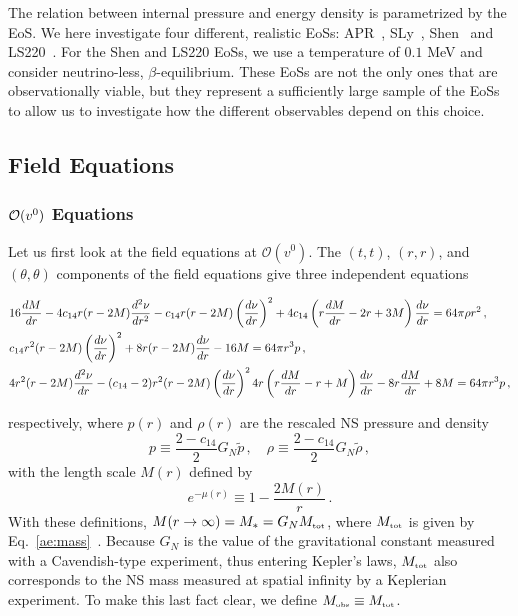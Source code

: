 \documentclass[prd,aps,twocolumn,nofootinbib,showpacs,superscriptaddress]{revtex4-1}
\newcommand\be{\begin{equation}}
\newcommand\ee{\end{equation}}
\newcommand\bw{\begin{widetext}}
\newcommand\ew{\end{widetext}}
\newcommand{\tot}{{\mbox{\tiny tot}}}
\newcommand{\obs}{{\mbox{\tiny obs}}}
\begin{document}
The relation between internal pressure and energy density is
parametrized by the EoS. We here investigate four different,
realistic EoSs: APR~\cite{APR}, SLy~\cite{SLy},
Shen~\cite{Shen1,Shen2} and LS220~\cite{LS}. For the Shen and LS220 EoSs, we use
a temperature of $0.1$ MeV and consider neutrino-less,
$\beta$-equilibrium. These EoSs are not the only ones that are observationally viable, but they
represent a sufficiently large sample of the EoSs to allow us
to investigate how the different observables depend on this choice. 

\subsection{Field Equations}
\subsubsection{${\cal{O}}(v^0)$ Equations}
\label{eqs_Ov0}

Let us first look at the field equations at $\mathcal{O}(v^0)$. The
$(t,t)$, $(r,r)$, and $(\theta,\theta)$ components of the field
equations give three independent equations
%
\bw
\begin{align}
\label{Ein-tt-0}
&16 \frac{dM}{dr}  -4 c_{14} r (r-2M) \frac{d^2\nu}{dr^2}- c_{14} r
(r-2M) \left( \frac{d\nu}{dr} \right)^2  +4 c_{14} \left( r
\frac{dM}{dr}-2r +3M \right) \frac{d\nu}{dr} = 64 \pi \rho r^2\,,  \\
\label{Ein-rr-0}
&c_{14} r^2(r-2M) \left( \frac{d\nu}{dr} \right)^2 +8 r (r-2M)
\frac{d\nu}{dr}-16 M = 64 \pi r^3 p\,,  \\
\label{Ein-thth-0}
& 4 r^2 (r-2M) \frac{d^2\nu}{dr}-(c_{14}-2) r^2 (r-2M) \left(
\frac{d\nu}{dr} \right)^2  \-4 r \left( r \frac{dM}{dr} -r+M
\right) \frac{d\nu}{dr}-8r\frac{dM}{dr}+8M = 64 \pi r^3 p\,,
\end{align}
\ew
%
respectively, where 
$p(r)$ and $\rho(r)$ are the rescaled NS pressure and density 
%
\be p \equiv \frac{2-c_{14}}{2} G_N \tilde{p}\,, \quad \rho \equiv
\frac{2-c_{14}}{2} G_N \tilde{\rho}\,, 
\label{prho-rescale}
\ee
%
with the length scale $M(r)$ defined by
%
\be e^{-\mu(r)} \equiv 1-\frac{2 M(r)}{r}\,.  
\label{M-def}
\ee
%
With these definitions, $M(r \to \infty) = M_{*}  = G_{N} M_{\tot}$, 
where $M_{\tot}$ is given by Eq.~\eqref{ae:mass}~\cite{Foster:2005fr,Eling:2005zq}. Because $G_N$ is the value of 
the gravitational constant measured with a Cavendish-type experiment, thus entering Kepler's laws, 
$M_{\tot}$ also corresponds to the NS mass measured at spatial infinity by a Keplerian experiment. To make this last fact clear, 
we define $M_\obs \equiv M_{\tot}$.
\end{document}
